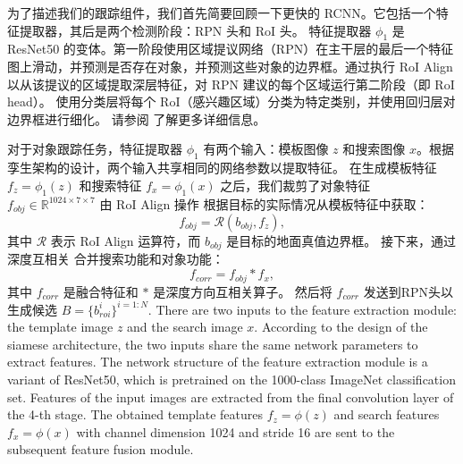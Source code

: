
为了描述我们的跟踪组件，我们首先简要回顾一下更快的 RCNN。它包括一个特征提取器，其后是两个检测阶段：RPN 头和 RoI 头。
特征提取器 $\phi_{1}$ 是 ResNet50 的变体。第一阶段使用区域提议网络（RPN）在主干层的最后一个特征图上滑动，并预测是否存在对象，并预测这些对象的边界框。通过执行 RoI Align \cite{He2018MaskR} 以从该提议的区域提取深层特征，对 RPN 建议的每个区域运行第二阶段（即 RoI head）。
使用分类层将每个 RoI（感兴趣区域）分类为特定类别，并使用回归层对边界框进行细化。
请参阅 \cite{ren2015faster} 了解更多详细信息。

对于对象跟踪任务，特征提取器 $\phi_{1}$ 有两个输入：模板图像 $z$ 和搜索图像 $x$。根据孪生架构的设计，两个输入共享相同的网络参数以提取特征。
在生成模板特征 $f_{z} = \phi_{1}(z)$ 和搜索特征 $f_{x} = \phi_{1}(x)$ 之后，我们裁剪了对象特征 $f_{obj} \in \mathbb{R}^{1024 \times 7 \times 7}$ 由 RoI Align 操作 \cite{He2018MaskR} 根据目标的实际情况从模板特征中获取：
\begin{equation}
    f_{obj} = \mathcal{R}(b_{obj}, f_{z}),
\end{equation}
其中 $\mathcal{R}$ 表示 RoI Align 运算符，而 $b_{obj}$ 是目标的地面真值边界框。
接下来，通过深度互相关 \cite{SiamRPN++} 合并搜索功能和对象功能：
\begin{equation}
    f_{corr} = f_{obj} * f_{x},
\end{equation}
其中 $f_{corr}$ 是融合特征和 $*$ 是深度方向互相关算子。
然后将 $f_{corr}$ 发送到RPN头以生成候选 $B=\{b^{i}_{roi}\}^{i=1:N}$.
\iffalse
There are two inputs to the feature extraction module: the template image $z$ and the search image $x$. According to the design of the siamese architecture, the two inputs share the same network parameters to extract features.
The network structure of the feature extraction module is a variant of ResNet50, which is pretrained on the 1000-class ImageNet classification set. Features of the input images are extracted from the final convolution layer of the 4-th stage. The obtained template features $f_{z} = \phi(z)$ and search features $f_{x} = \phi(x)$ with channel dimension 1024 and stride 16 are sent to the subsequent feature fusion module.


